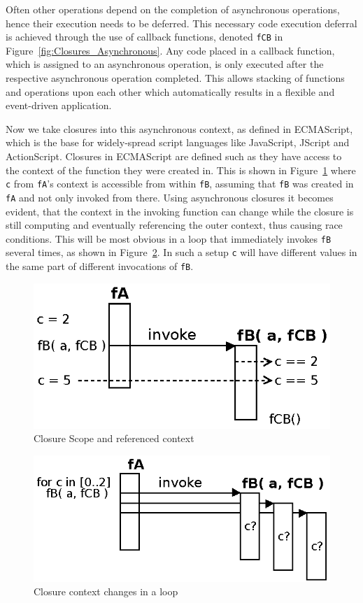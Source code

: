 Often other operations depend on the completion of asynchronous operations, hence their execution needs to be deferred.
This necessary code execution deferral is achieved through the use of callback functions, denoted \texttt{fCB} in Figure~\ref{fig:Closures_Asynchronous}.
Any code placed in a callback function, which is assigned to an asynchronous operation, is only executed after the respective asynchronous operation completed.
This allows stacking of functions and operations upon each other which automatically results in a flexible and event-driven application.


Now we take closures into this asynchronous context, as defined in ECMAScript\cite{EcmaScript}, which is the base for widely-spread script languages like JavaScript, JScript and ActionScript.
Closures in ECMAScript\cite{EcmaScript} are defined such as they have access to the context of the function they were created in.
This is shown in Figure~\ref{fig:Closures_Closure-1} where \texttt{c} from \texttt{fA}'s context is accessible from within \texttt{fB}, assuming that \texttt{fB} was created in \texttt{fA} and not only invoked from there.
Using asynchronous closures it becomes evident, that the context in the invoking function can change while the closure is still computing and eventually referencing the outer context, thus causing race conditions.
This will be most obvious in a loop that immediately invokes \texttt{fB} several times, as shown in Figure~\ref{fig:Closures_Closure-2}.
In such a setup \texttt{c} will have different values in the same part of different invocations of \texttt{fB}.
\begin{figure}[!ht]
	\centering
  \includegraphics{figures/Closures_Closure-1}
	\caption{Closure Scope and referenced context}
	\label{fig:Closures_Closure-1}
\end{figure}
\begin{figure}[!ht]
	\centering
  \includegraphics{figures/Closures_Closure-2}
	\caption{Closure context changes in a loop}
	\label{fig:Closures_Closure-2}
\end{figure}


